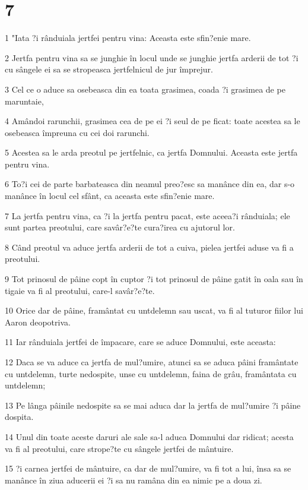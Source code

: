 \chapter{7}

\par 1 "Iata ?i rânduiala jertfei pentru vina: Aceasta este sfin?enie mare.
\par 2 Jertfa pentru vina sa se junghie în locul unde se junghie jertfa arderii de tot ?i cu sângele ei sa se stropeasca jertfelnicul de jur împrejur.
\par 3 Cel ce o aduce sa osebeasca din ea toata grasimea, coada ?i grasimea de pe maruntaie,
\par 4 Amândoi rarunchii, grasimea cea de pe ei ?i seul de pe ficat: toate acestea sa le osebeasca împreuna cu cei doi rarunchi.
\par 5 Acestea sa le arda preotul pe jertfelnic, ca jertfa Domnului. Aceasta este jertfa pentru vina.
\par 6 To?i cei de parte barbateasca din neamul preo?esc sa manânce din ea, dar s-o manânce în locul cel sfânt, ca aceasta este sfin?enie mare.
\par 7 La jertfa pentru vina, ca ?i la jertfa pentru pacat, este aceea?i rânduiala; ele sunt partea preotului, care savâr?e?te cura?irea cu ajutorul lor.
\par 8 Când preotul va aduce jertfa arderii de tot a cuiva, pielea jertfei aduse va fi a preotului.
\par 9 Tot prinosul de pâine copt în cuptor ?i tot prinosul de pâine gatit în oala sau în tigaie va fi al preotului, care-l savâr?e?te.
\par 10 Orice dar de pâine, framântat cu untdelemn sau uscat, va fi al tuturor fiilor lui Aaron deopotriva.
\par 11 Iar rânduiala jertfei de împacare, care se aduce Domnului, este aceasta:
\par 12 Daca se va aduce ca jertfa de mul?umire, atunci sa se aduca pâini framântate cu untdelemn, turte nedospite, unse cu untdelemn, faina de grâu, framântata cu untdelemn;
\par 13 Pe lânga pâinile nedospite sa se mai aduca dar la jertfa de mul?umire ?i pâine dospita.
\par 14 Unul din toate aceste daruri ale sale sa-l aduca Domnului dar ridicat; acesta va fi al preotului, care strope?te cu sângele jertfei de mântuire.
\par 15 ?i carnea jertfei de mântuire, ca dar de mul?umire, va fi tot a lui, însa sa se manânce în ziua aducerii ei ?i sa nu ramâna din ea nimic pe a doua zi.
